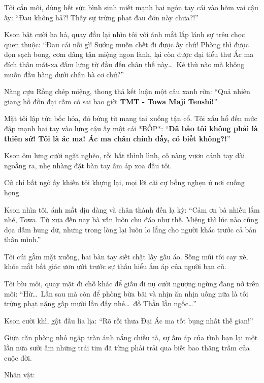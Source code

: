 \documentclass[../main.tex]{subfiles}
\begin{document}
Tôi cắn môi, dùng hết sức bình sinh miết mạnh hai ngón tay cái vào hõm vai cậu ấy: ``Đau không hả?! Thấy sự trừng phạt đau đớn này chưa?!''

Kson bật cười ha hả, quay đầu lại nhìn tôi với ánh mắt lấp lánh sự trêu chọc quen thuộc: ``Đau cái nỗi gì! Sướng muốn chết đi được ấy chứ! Phòng thì được dọn sạch bong, cơm dâng tận miệng ngon lành, lại còn được đại tiểu thư Ác ma đích thân mát-xa đấm lưng từ đầu đến chân thế này\dots\ Kẻ thù nào mà không muốn đầu hàng dưới chân bà cơ chứ?''

Nàng cựu Rồng chép miệng, thong thả kết luận một câu xanh rờn: ``Quả nhiên giang hồ đồn đại cấm có sai bao giờ: \textbf{TMT - Towa Maji Tenshi!}''

Mặt tôi lập tức bốc hỏa, đỏ bừng từ mang tai xuống tận cổ. Tôi xấu hổ đến mức đập mạnh hai tay vào lưng cậu ấy một cái *BỐP*: ``\textbf{Đã bảo tôi không phải là thiên sứ! Tôi là ác ma! Ác ma chân chính đấy, có biết không?!}''

Kson ôm lưng cười ngặt nghẽo, rồi bất thình lình, cô nàng vươn cánh tay dài ngoẵng ra, nhẹ nhàng đặt bàn tay ấm áp xoa đầu tôi.

Cử chỉ bất ngờ ấy khiến tôi khựng lại, mọi lời cãi cự bỗng nghẹn ứ nơi cuống họng.

Kson nhìn tôi, ánh mắt dịu dàng và chân thành đến lạ kỳ: ``Cảm ơn bà nhiều lắm nhé, Towa. Từ xưa đến nay bà vẫn luôn chu đáo như thế. Miệng thì lúc nào cũng dọa dẫm hung dữ, nhưng trong lòng lại luôn lo lắng cho người khác trước cả bản thân mình.''

Tôi cúi gằm mặt xuống, hai bàn tay siết chặt lấy gấu áo. Sống mũi tôi cay xè, khóe mắt bất giác ươn ướt trước sự thấu hiểu ấm áp của người bạn cũ.

Tôi bĩu môi, quay mặt đi chỗ khác để giấu đi nụ cười ngượng ngùng đang nở trên môi: ``Hừ\dots\ Lần sau mà còn để phòng bừa bãi và nhịn ăn nhịn uống nữa là tôi trừng phạt nặng gấp mười lần đấy nhé\dots\ đồ Thằn lằn ngốc\dots''

Kson cười khì, gật đầu lia lịa: ``Rõ rồi thưa Đại Ác ma tốt bụng nhất thế gian!''

Giữa căn phòng nhỏ ngập tràn ánh nắng chiều tà, sự ấm áp của tình bạn lại một lần nữa sưởi ấm những trái tim đã từng phải trải qua biết bao thăng trầm của cuộc đời.

\newpage

\begin{center}
  {\caviar\fontsize{12pt}{12pt}\selectfont Nhân vật:      }
\end{center}
\end{document}
